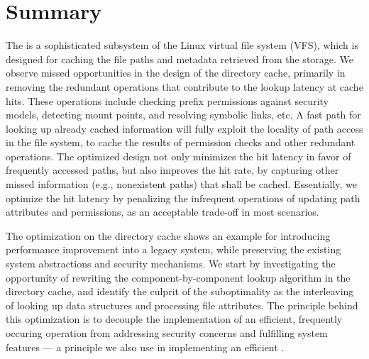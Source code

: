 \newpage
\section{Summary}
\label{sec:dcache:summary}

The  is a sophisticated subsystem
of the Linux virtual file system (VFS),
which is designed for caching the file paths and metadata
retrieved from the storage.
We observe missed opportunities in the design of the directory cache,
primarily in removing the redundant operations
that contribute to the lookup latency at cache hits.
These operations include checking prefix permissions against security models,
detecting mount points,
and resolving symbolic links, etc.
A fast path for looking up already cached information
will fully exploit the locality of path access in the file system,
to cache the results of permission checks and other redundant operations.
The optimized design not only
minimizes the hit latency in favor of frequently accessed paths,
but also improves the hit rate,
by capturing other missed information (e.g., nonexistent paths) that
shall be cached. %
Essentially, we optimize the hit latency by penalizing the infrequent operations
of updating path attributes and permissions,
as an acceptable trade-off in most scenarios.

The optimization on the directory cache
shows an example for introducing performance improvement
into a legacy system,
while preserving the existing
system abstractions and security mechanisms.
We start by investigating the opportunity of
rewriting the component-by-component lookup algorithm
in the directory cache,
and identify the culprit of the suboptimality
as the interleaving of looking up data structures and processing file attributes.
The principle behind this optimization
is to decouple the implementation of
an efficient, frequently occuring operation
from addressing security concerns and fulfilling system features
--- a principle we also use
in implementing an efficient \libos{}.








